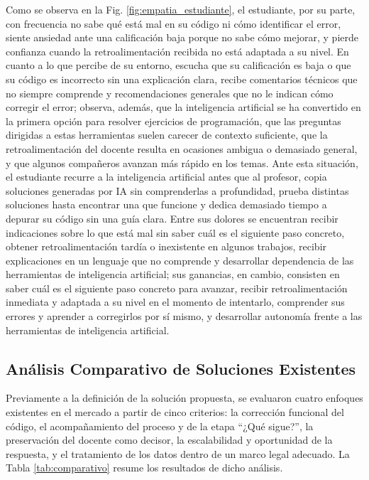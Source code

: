 \documentclass[letterpaper, 10 pt, conference]{ieeeconf}
\begin{document}
Como se observa en la Fig. \ref{fig:empatia_estudiante}, el estudiante, por su parte, con frecuencia no sabe qué está mal en su código ni cómo identificar el error, siente ansiedad ante una calificación baja porque no sabe cómo mejorar, y pierde confianza cuando la retroalimentación recibida no está adaptada a su nivel. En cuanto a lo que percibe de su entorno, escucha que su calificación es baja o que su código es incorrecto sin una explicación clara, recibe comentarios técnicos que no siempre comprende y recomendaciones generales que no le indican cómo corregir el error; observa, además, que la inteligencia artificial se ha convertido en la primera opción para resolver ejercicios de programación, que las preguntas dirigidas a estas herramientas suelen carecer de contexto suficiente, que la retroalimentación del docente resulta en ocasiones ambigua o demasiado general, y que algunos compañeros avanzan más rápido en los temas. Ante esta situación, el estudiante recurre a la inteligencia artificial antes que al profesor, copia soluciones generadas por IA sin comprenderlas a profundidad, prueba distintas soluciones hasta encontrar una que funcione y dedica demasiado tiempo a depurar su código sin una guía clara. Entre sus dolores se encuentran recibir indicaciones sobre lo que está mal sin saber cuál es el siguiente paso concreto, obtener retroalimentación tardía o inexistente en algunos trabajos, recibir explicaciones en un lenguaje que no comprende y desarrollar dependencia de las herramientas de inteligencia artificial; sus ganancias, en cambio, consisten en saber cuál es el siguiente paso concreto para avanzar, recibir retroalimentación inmediata y adaptada a su nivel en el momento de intentarlo, comprender sus errores y aprender a corregirlos por sí mismo, y desarrollar autonomía frente a las herramientas de inteligencia artificial.

\subsection{Análisis Comparativo de Soluciones Existentes}
Previamente a la definición de la solución propuesta, se evaluaron cuatro enfoques existentes en el mercado a partir de cinco criterios: la corrección funcional del código, el acompañamiento del proceso y de la etapa “¿Qué sigue?”, la preservación del docente como decisor, la escalabilidad y oportunidad de la respuesta, y el tratamiento de los datos dentro de un marco legal adecuado. La Tabla \ref{tab:comparativo} resume los resultados de dicho análisis.
\end{document}
